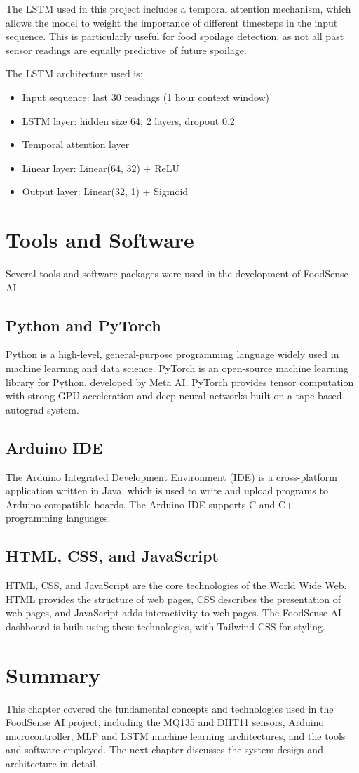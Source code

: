 The LSTM used in this project includes a temporal attention mechanism, which allows the model to weight the importance of different timesteps in the input sequence. This is particularly useful for food spoilage detection, as not all past sensor readings are equally predictive of future spoilage.

The LSTM architecture used is:
\begin{itemize}
    \item Input sequence: last 30 readings (1 hour context window)
    \item LSTM layer: hidden size 64, 2 layers, dropout 0.2
    \item Temporal attention layer
    \item Linear layer: Linear(64, 32) + ReLU
    \item Output layer: Linear(32, 1) + Sigmoid
\end{itemize}

\section{Tools and Software}
Several tools and software packages were used in the development of FoodSense AI.

\subsection{Python and PyTorch}
Python is a high-level, general-purpose programming language widely used in machine learning and data science. PyTorch is an open-source machine learning library for Python, developed by Meta AI. PyTorch provides tensor computation with strong GPU acceleration and deep neural networks built on a tape-based autograd system.

\subsection{Arduino IDE}
The Arduino Integrated Development Environment (IDE) is a cross-platform application written in Java, which is used to write and upload programs to Arduino-compatible boards. The Arduino IDE supports C and C++ programming languages.

\subsection{HTML, CSS, and JavaScript}
HTML, CSS, and JavaScript are the core technologies of the World Wide Web. HTML provides the structure of web pages, CSS describes the presentation of web pages, and JavaScript adds interactivity to web pages. The FoodSense AI dashboard is built using these technologies, with Tailwind CSS for styling.

\section{Summary}
This chapter covered the fundamental concepts and technologies used in the FoodSense AI project, including the MQ135 and DHT11 sensors, Arduino microcontroller, MLP and LSTM machine learning architectures, and the tools and software employed. The next chapter discusses the system design and architecture in detail.
